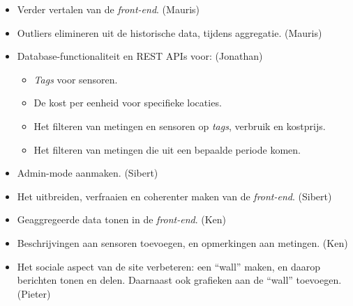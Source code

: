 \documentclass[10pt,a4paper]{article}
\begin{document}
  \begin{itemize}
  	
  	\item Verder vertalen van de \emph{front-end}. (Mauris)
  	
  	\item Outliers elimineren uit de historische data, tijdens aggregatie. (Mauris)
  	
  	\item Database-functionaliteit en REST APIs voor: (Jonathan)
  	
  	\begin{itemize}
  		
  		\item \emph{Tags} voor sensoren.
  		
  		\item De kost per eenheid voor specifieke locaties.
  		
  		\item Het filteren van metingen en sensoren op \emph{tags}, verbruik en kostprijs.
  		
  		\item Het filteren van metingen die uit een bepaalde periode komen. 
  		
  	\end{itemize}
  	
  	\item Admin-mode aanmaken. (Sibert)
  	
  	\item Het uitbreiden, verfraaien en coherenter maken van de \emph{front-end}. (Sibert)
  	
  	\item Geaggregeerde data tonen in de \emph{front-end}. (Ken)
  	
  	\item Beschrijvingen aan sensoren toevoegen, en opmerkingen aan metingen. (Ken)
  	
  	\item Het sociale aspect van de site verbeteren: een ``wall'' maken, en daarop berichten tonen en delen. Daarnaast ook grafieken aan de ``wall'' toevoegen. (Pieter)
  	
  \end{itemize}
  
\end{document}
